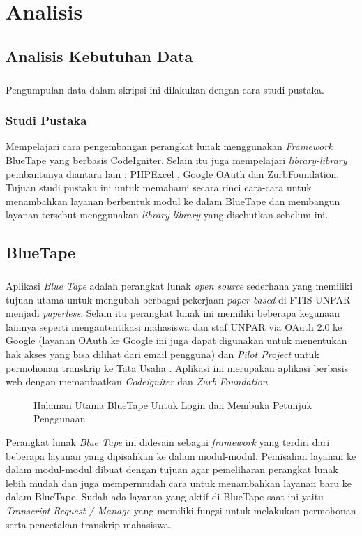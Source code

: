 \chapter{Analisis}
\label{chap:analisis}
\setcounter{secnumdepth}{3}

\section{Analisis Kebutuhan Data}
\paragraph{} Pengumpulan data dalam skripsi ini dilakukan dengan cara studi pustaka.
\subsection{Studi Pustaka}
Mempelajari cara pengembangan perangkat lunak menggunakan \textit{Framework} BlueTape yang berbasis CodeIgniter. Selain itu juga mempelajari \textit{library-library} pembantunya diantara lain : PHPExcel , Google OAuth dan ZurbFoundation. Tujuan studi pustaka ini untuk memahami secara rinci cara-cara untuk menambahkan layanan berbentuk modul ke dalam BlueTape dan membangun layanan tersebut menggunakan \textit{library-library} yang disebutkan sebelum ini.

\section{BlueTape}
\paragraph{} Aplikasi \textit{Blue Tape} adalah perangkat lunak \textit{open source} sederhana yang memiliki tujuan utama untuk mengubah berbagai pekerjaan \textit{paper-based} di FTIS UNPAR menjadi \textit{paperless}. Selain itu perangkat lunak ini memiliki beberapa kegunaan lainnya seperti mengautentikasi mahasiswa dan staf UNPAR via OAuth 2.0 ke Google (layanan OAuth ke Google ini juga dapat digunakan untuk menentukan hak akses yang bisa dilihat dari email pengguna) dan \textit{Pilot Project} untuk permohonan transkrip ke Tata Usaha . Aplikasi ini merupakan aplikasi berbasis web dengan memanfaatkan \textit{Codeigniter} dan \textit{Zurb Foundation}. 
\newline
\begin{figure} [H]
	\centering  
	\caption[Halaman Utama BlueTape Untuk Login dan Membuka Petunjuk Penggunaan]{Halaman Utama BlueTape Untuk Login dan Membuka Petunjuk Penggunaan} 
	\label{fig:flow-chart-CodeIgniter} 
\end{figure}
Perangkat lunak \textit{Blue Tape} ini didesain sebagai \textit{framework} yang terdiri dari beberapa layanan yang dipisahkan ke dalam modul-modul. Pemisahan layanan ke dalam modul-modul dibuat dengan tujuan agar pemeliharan perangkat lunak lebih mudah dan juga mempermudah cara untuk menambahkan layanan baru ke dalam BlueTape. Sudah ada layanan yang aktif di BlueTape saat ini yaitu \textit{Transcript Request / Manage} yang memiliki fungsi untuk melakukan permohonan serta pencetakan transkrip mahasiswa.

